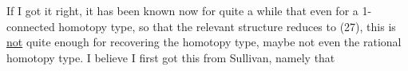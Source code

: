 If I got it right,  it  has been
known now for quite a while that even for a 1-connected homotopy type,
so that the relevant structure reduces to (27),   this is \uline{not} quite
enough for recovering the homotopy type,  maybe not even the rational
homotopy type.  I believe I first got this from Sullivan,  namely that


